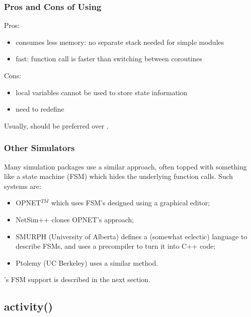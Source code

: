 \subsubsection{Pros and Cons of Using }
\label{sec:simple-modules:handlemessage:pros-and-cons}

Pros:
\begin{itemize}
  \item consumes less memory: no separate stack needed for simple modules
  \item fast: function call is faster than switching between coroutines
\end{itemize}

Cons:
\begin{itemize}
  \item local variables cannot be used to store state information
  \item need to redefine 
\end{itemize}

Usually,  should be preferred over .


\subsubsection{Other Simulators}
\label{sec:simple-modules:handlemessage:other-simulators}

Many simulation packages use a similar approach, often topped with
something like a state machine
(FSM) which hides the underlying function calls. Such
systems are:
\begin{itemize}
  \item OPNET$^{TM}$ which uses FSM's designed using a graphical editor;
  \item NetSim++ clones OPNET's approach;
  \item SMURPH (University of Alberta) defines a (somewhat eclectic)
      language to describe FSMs, and uses a precompiler to turn it
      into C++ code;
  \item Ptolemy (UC Berkeley) uses a similar method.
\end{itemize}

{\opp}'s FSM support is described in the next section.



\subsection{activity()}
\label{sec:simple-modules:activity}

